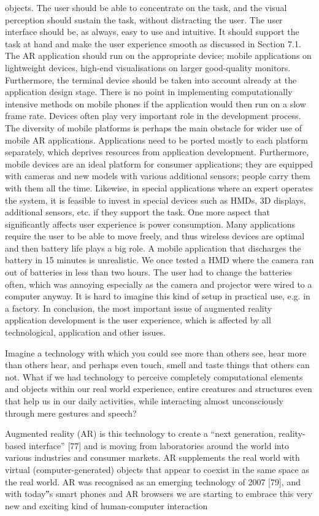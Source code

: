 objects. The user should be able to concentrate on the task, and the visual perception should sustain the task, without distracting the user. The user interface should be, as always, easy to use and intuitive. It should support the task at hand and make the user experience smooth as discussed in Section 7.1. The AR application should run on the appropriate device; mobile applications on lightweight devices, high-end visualisations on larger good-quality monitors. Furthermore, the terminal device should be taken into account already at the application design stage. There is no point in implementing computationally intensive methods on mobile phones if the application would then run on a slow frame rate. Devices often play very important role in the development process. The diversity of mobile platforms is perhaps the main obstacle for wider use of mobile AR applications. Applications need to be ported mostly to each platform separately, which deprives resources from application development. Furthermore, mobile devices are an ideal platform for consumer applications; they are equipped with cameras and new models with various additional sensors; people carry them with them all the time. Likewise, in special applications where an expert operates the system, it is feasible to invest in special devices such as HMDs, 3D displays, additional sensors, etc. if they support the task. One more aspect that significantly affects user experience is power consumption. Many applications require the user to be able to move freely, and thus wireless devices are optimal and then battery life plays a big role. A mobile application that discharges the battery in 15 minutes is unrealistic. We once tested a HMD where the camera ran out of batteries in less than two hours. The user had to change the batteries often, which was annoying especially as the camera and projector were wired to a computer anyway. It is hard to imagine this kind of setup in practical use, e.g. in a factory. In conclusion, the most important issue of augmented reality application development is the user experience, which is affected by all technological, application and other issues.



Imagine a technology with which you could see more than
others see, hear more than others hear, and perhaps even
touch, smell and taste things that others can not. What if we
had technology to perceive completely computational elements
and objects within our real world experience, entire
creatures and structures even that help us in our daily activities, while interacting almost unconsciously through mere
gestures and speech?

Augmented reality (AR) is this technology to create a
“next generation, reality-based interface” [77] and is moving
from laboratories around the world into various industries
and consumer markets. AR supplements the real world with
virtual (computer-generated) objects that appear to coexist in
the same space as the real world. AR was recognised as an
emerging technology of 2007 [79], and with today‟s smart
phones and AR browsers we are starting to embrace this very
new and exciting kind of human-computer interaction
